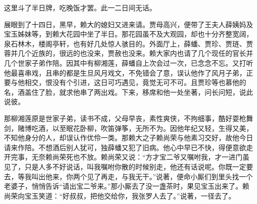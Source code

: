 \begin{parag}
    这里斗了半日牌，吃晚饭才罢。此一二日间无话。
\end{parag}


\begin{parag}
    展眼到了十四日，黑早，赖大的媳妇又进来请。贾母高兴，便带了王夫人薛姨妈及宝玉姊妹等，到赖大花园中坐了半日。那花园虽不及大观园，却也十分齐整宽阔，泉石林木，楼阁亭轩，也有好几处惊人骇目的。外面厅上，薛蟠、贾珍、贾琏、贾蓉并几个近族的，很远的也没来，贾赦也没来。赖大家内也请了几个现任的官长并几个世家子弟作陪。因其中有柳湘莲，薛蟠自上次会过一次，已念念不忘。又打听他最喜串戏，且串的都是生旦风月戏文，不免错会了意，误认他作了风月子弟，正要与他相交，恨没有个引进，这日可巧遇见，竟觉无可不可。且贾珍等也慕他的名，酒盖住了脸，就求他串了两出戏。下来，移席和他一处坐著，问长问短，说此说彼。
\end{parag}


\begin{parag}
    那柳湘莲原是世家子弟，读书不成，父母早丧，素性爽侠，不拘细事，酷好耍枪舞剑，赌博吃酒，以至眠花卧柳，吹笛弹筝，无所不为。因他年纪又轻，生得又美，不知他身分的人，却误认作优伶一类。那赖大之子赖尚荣与他素习交好，故他今日请来作陪。不想酒后别人犹可，独薛蟠又犯了旧病。他心中早已不快，得便意欲走开完事，无奈赖尚荣死也不放。赖尚荣又说：“方才宝二爷又嘱咐我，才一进门虽见了，只是人多不好说话，叫我嘱咐你散的时候别走，他还有话说呢。你既一定要去，等我叫出他来，你两个见了再走，与我无干。”说著，便命小厮们到里头找一个老婆子，悄悄告诉“请出宝二爷来。”那小厮去了没一盏茶时，果见宝玉出来了。赖尚荣向宝玉笑道：“好叔叔，把他交给你，我张罗人去了。”说著，一径去了。
\end{parag}


